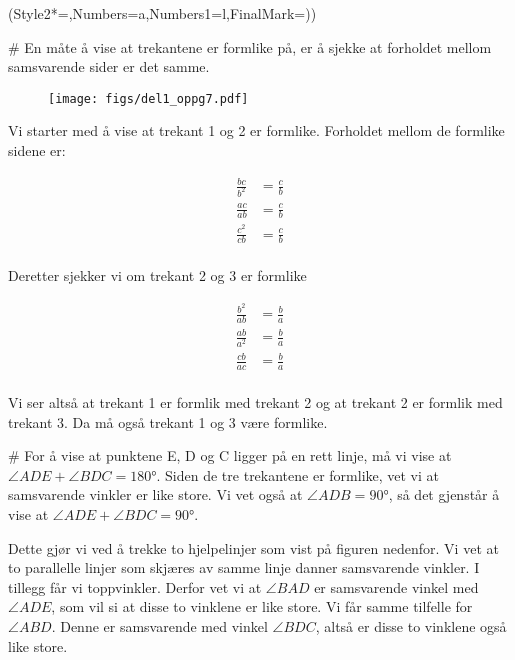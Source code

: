 \begin{easylist}[enumerate]
	\ListProperties(Style2*=,Numbers=a,Numbers1=l,FinalMark={)})
	
	# En måte å vise at trekantene er formlike på, er å sjekke at forholdet mellom samsvarende sider er det samme. 
	
	\begin{figure}[ht!]
		\centering
		\texttt{[image: figs/del1\_oppg7.pdf]}
		\label{fig:del1_oppg7}
	\end{figure}	
	
		Vi starter med å vise at trekant 1 og 2 er formlike. Forholdet mellom de formlike sidene er:
		
	
	\begin{equation*}
		\begin{aligned}
			\frac{bc}{b^2} & = \frac{c}{b} \\
			\frac{ac}{ab} & = \frac{c}{b} \\
			\frac{c^2}{cb} & = \frac{c}{b} \\			
		\end{aligned}
	\end{equation*}
	
	Deretter sjekker vi om trekant 2 og 3 er formlike
	
	\begin{equation*}
		\begin{aligned}
			\frac{b^2}{ab} & = \frac{b}{a} \\
			\frac{ab}{a^2} & = \frac{b}{a} \\
			\frac{cb}{ac} & = \frac{b}{a} \\			
		\end{aligned}
	\end{equation*}
	
	Vi ser altså at trekant 1 er formlik med trekant 2 og at trekant 2 er formlik med trekant 3. Da må også trekant 1 og 3 være formlike. 
	
	# For å vise at punktene E, D og C ligger på en rett linje, må vi vise at $\angle ADE + \angle BDC = \ang{180} $. Siden de tre trekantene er formlike, vet vi at samsvarende vinkler er like store. Vi vet også at $\angle ADB = \ang{90}$, så det gjenstår å vise at $\angle ADE + \angle BDC = \ang{90}$.
	
	Dette gjør vi ved å trekke to hjelpelinjer som vist på figuren nedenfor. Vi vet at to parallelle linjer som skjæres av samme linje danner samsvarende vinkler. I tillegg får vi toppvinkler. Derfor vet vi at $\angle BAD$ er samsvarende vinkel med $\angle ADE$, som vil si at disse to vinklene er like store. Vi får samme tilfelle for $\angle ABD$. Denne er samsvarende med vinkel $\angle BDC$, altså er disse to vinklene også like store.
	

\end{easylist}
